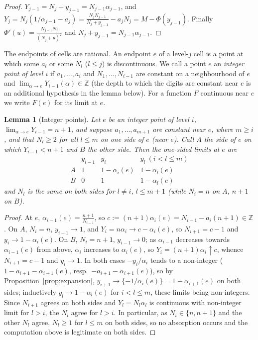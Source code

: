 \documentclass[11pt]{amsart}
\newtheorem{lemma}[theorem]{Lemma}
\theoremstyle{definition}
\numberwithin{equation}{section}
\newcommand{\Z}{\mathbb{Z}}
\newcommand{\fr}[1]{\{#1\}}
\begin{document}
\begin{proof}
$Y_{j-1}=N_j+y_{j-1}=N_{j-1}\alpha_{j-1}$, and $Y_j=N_j(1/\alpha_{j-1}-a_j)=\frac{N_jN_{j-1}}{N_j+y_{j-1}}-a_jN_j=M-\Phi(y_{j-1})$.
Finally $\Phi'(u)=\frac{N_{j-1}N_j}{(N_j+u)^2}$ and $N_j+y_{j-1}=N_{j-1}\alpha_{j-1}$.
\end{proof}

The endpoints of cells are rational. An endpoint $e$ of a level-$j$ cell is a point at which some $a_l$ or some $N_l$
($l\le j$) is discontinuous. We call a point $e$ an \emph{integer point of level $i$} if $a_1,\dots,a_i$ and $N_1,\dots,N_{i-1}$
are constant on a neighbourhood of $e$ and $\lim_{\alpha\to e}Y_{i-1}(\alpha)\in\Z$ (the depth to which the digits are constant near $e$ is
an additional hypothesis in the lemma below). For a function $F$ continuous near
$e$ we write $F(e)$ for its limit at $e$.

\begin{lemma}[Integer points]\label{lem:intpt}
Let $e$ be an integer point of level $i$, $\lim_{\alpha\to e}Y_{i-1}=n+1$, and suppose $a_1,\dots,a_{m+1}$ are constant near
$e$, where $m\ge i$, and that $N_l\ge2$ for all $l\le m$ on one side of $e$ (near $e$). Call $A$ the side of $e$ on which $Y_{i-1}<n+1$ and $B$ the
other side. Then the one-sided limits at $e$ are
\[
\begin{array}{c|ccc}
 & y_{i-1} & y_i & y_l\ (i<l\le m)\\\hline
A & 1 & 1-\alpha_i(e) & 1-\alpha_l(e)\\
B & 0 & 1 & 1-\alpha_l(e)
\end{array}
\]
and $N_l$ is the same on both sides for $l\ne i$, $l\le m+1$ (while $N_i=n$ on $A$, $n+1$ on $B$).
\end{lemma}

\begin{proof}
At $e$, $\alpha_{i-1}(e)=\frac{n+1}{N_{i-1}}$, so $c:=(n+1)\alpha_i(e)=N_{i-1}-a_i(n+1)\in\Z$. On $A$, $N_i=n$, $y_{i-1}\to1$, and
$Y_i=n\alpha_i\to c-\alpha_i(e)$, so $N_{i+1}=c-1$ and $y_i\to1-\alpha_i(e)$. On $B$, $N_i=n+1$, $y_{i-1}\to0$; as
$\alpha_{i-1}$ decreases towards $\alpha_{i-1}(e)$ from above, $\alpha_i$ increases to $\alpha_i(e)$, so $Y_i=(n+1)\alpha_i\uparrow c$, whence
$N_{i+1}=c-1$ and $y_i\to1$. In both cases $-y_i/\alpha_i$ tends to a non-integer
($1-a_{i+1}-\alpha_{i+1}(e)$, resp.\ $-a_{i+1}-\alpha_{i+1}(e)$), so by Proposition~\ref{prop:expansion},
$y_{i+1}\to\fr{-1/\alpha_i(e)}=1-\alpha_{i+1}(e)$ on both sides; inductively $y_l\to1-\alpha_l(e)$ for $i<l\le m$, these limits being
non-integers. Since $N_{i+1}$ agrees on both sides and $Y_l=N_l\alpha_l$ is continuous with non-integer limit for
$l>i$, the $N_l$ agree for $l>i$. In particular, as $N_i\in\{n,n+1\}$ and the other $N_l$ agree, $N_l\ge1$ for $l\le m$ on both sides, so no absorption occurs and the
computation above is legitimate on both sides.
\end{proof}
\end{document}
